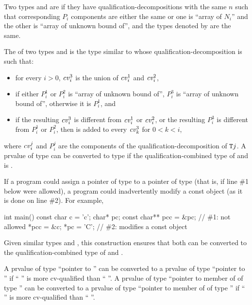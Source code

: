 \pnum
{}%
Two types  and  are  if
they have qualification-decompositions with the same $n$
such that corresponding $P_i$ components are either the same
or one is ``array of $N_i$'' and the other is ``array of unknown bound of'',
and the types denoted by  are the same.

\pnum
The  of two types  and 
is the type 
similar to  whose qualification-decomposition is such that:
\begin{itemize}
\item
for every $i > 0$, $\cv{}^3_i$ is the union of
$\cv{}^1_i$ and $\cv{}^2_i$,
\item
if either $P^1_i$ or $P^2_i$ is ``array of unknown bound of'',
$P^3_i$ is ``array of unknown bound of'', otherwise it is $P^1_i$, and
\item
if the resulting $\cv{}^3_i$ is different from $\cv{}^1_i$ or $\cv{}^2_i$,
or the resulting $P^3_i$ is different from $P^1_i$ or $P^2_i$,
then  is added to every $\cv{}^3_k$ for $0 < k < i$,
\end{itemize}
where $\cv{}^j_i$ and $P^j_i$ are the components of
the qualification-decomposition of $\tcode{T}j$.
A prvalue of type 
can be converted to type 
if the qualification-combined type of  and  is .
\begin{note}
If a program could assign a pointer of type  to a pointer of
type   (that is, if line \#1 below were
allowed), a program could inadvertently modify a const object
(as it is done on line \#2). For example,
\begin{codeblock}
int main() {
  const char c = 'c';
  char* pc;
  const char** pcc = &pc;       // \#1: not allowed
  *pcc = &c;
  *pc = 'C';                    // \#2: modifies a const object
}
\end{codeblock}
\end{note}
\begin{note}
Given similar types  and , this
construction ensures that
both can be converted to the qualification-combined type of  and .
\end{note}

\pnum
\begin{note}
A prvalue of type ``pointer to  '' can be
converted to a prvalue of type ``pointer to  '' if
`` '' is more cv-qualified than ``
''.
A prvalue of type ``pointer to member of  of type 
'' can be converted to a prvalue of type ``pointer to member
of  of type  '' if ``
'' is more cv-qualified than `` ''.
\end{note}

